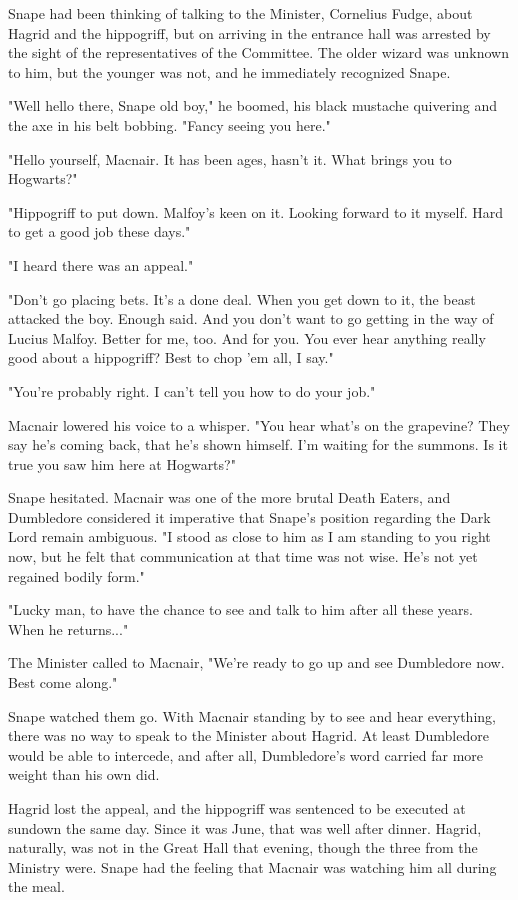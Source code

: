 Snape had been thinking of talking to the Minister, Cornelius Fudge, about Hagrid and the hippogriff, but on arriving in the entrance hall was arrested by the sight of the representatives of the Committee. The older wizard was unknown to him, but the younger was not, and he immediately recognized Snape.

"Well hello there, Snape old boy," he boomed, his black mustache quivering and the axe in his belt bobbing. "Fancy seeing you here."

"Hello yourself, Macnair. It has been ages, hasn't it. What brings you to Hogwarts?"

"Hippogriff to put down. Malfoy's keen on it. Looking forward to it myself. Hard to get a good job these days."

"I heard there was an appeal."

"Don't go placing bets. It's a done deal. When you get down to it, the beast attacked the boy. Enough said. And you don't want to go getting in the way of Lucius Malfoy. Better for me, too. And for you. You ever hear anything really good about a hippogriff? Best to chop 'em all, I say."

"You're probably right. I can't tell you how to do your job."

Macnair lowered his voice to a whisper. "You hear what's on the grapevine? They say he's coming back, that he's shown himself. I'm waiting for the summons. Is it true you saw him here at Hogwarts?"

Snape hesitated. Macnair was one of the more brutal Death Eaters, and Dumbledore considered it imperative that Snape's position regarding the Dark Lord remain ambiguous. "I stood as close to him as I am standing to you right now, but he felt that communication at that time was not wise. He's not yet regained bodily form."

"Lucky man, to have the chance to see and talk to him after all these years. When he returns..."

The Minister called to Macnair, "We're ready to go up and see Dumbledore now. Best come along."

Snape watched them go. With Macnair standing by to see and hear everything, there was no way to speak to the Minister about Hagrid. At least Dumbledore would be able to intercede, and after all, Dumbledore's word carried far more weight than his own did.

Hagrid lost the appeal, and the hippogriff was sentenced to be executed at sundown the same day. Since it was June, that was well after dinner. Hagrid, naturally, was not in the Great Hall that evening, though the three from the Ministry were. Snape had the feeling that Macnair was watching him all during the meal.

